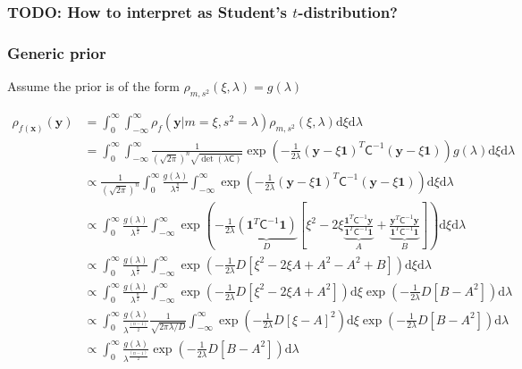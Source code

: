 \documentclass{svjour3}                     %
\newcommand{\bm}[1]{\boldsymbol{#1}}
\newcommand{\dif}[1]{\text{d}{#1}}
\newcommand{\vx}{\bm{x}}
\newcommand{\vy}{\bm{y}}
\newcommand{\vone}{\bm{1}}
\newcommand{\mC}{\mathsf{C}}
\newcommand{\mCInv}{\mathsf{C}^{-1}}
\begin{document}
\subsubsection{TODO: How to interpret as Student's $t$-distribution?}




\subsubsection{Generic prior}
Assume the prior is of the form $ \rho_{m,s^2} (\xi, \lambda) = g(\lambda) $ 

\begin{align*}
\rho_{f(\vx)}(\vy) &=\int_{0}^\infty \int_{-\infty}^\infty \rho_{f} (\vy | m=\xi, s^2=\lambda) 
\rho_{m,s^2} (\xi, \lambda) \dif{\xi} \dif{\lambda} 
\\
&= \int_{0}^\infty \int_{-\infty}^\infty \frac{1}{(\sqrt{2 \pi})^n \sqrt{\det(\lambda \mC)}} 
\exp \left( -\frac{1}{2\lambda} (\vy - \xi \vone)^T\mCInv (\vy- \xi\vone)\right) g(\lambda) \dif{\xi} \dif{\lambda}
\\
& \propto \frac{1}{(\sqrt{2 \pi})^n} \int_{0}^\infty \frac{g(\lambda)}{\lambda ^{\frac n2} } 
\int_{-\infty}^\infty \exp \left( -\frac{1}{2\lambda} (\vy - \xi \vone)^T\mCInv (\vy- \xi\vone)\right)  \dif{\xi} \dif{\lambda}
\\
& \propto \int_{0}^\infty \frac{g(\lambda)}{\lambda^{\frac n2 }}
\int_{-\infty}^\infty \exp \left( -\frac{1}{2\lambda} 
\underbrace{(\vone^T \mCInv \vone)}_{D}
\left[
\xi^2 -2 \xi \underbrace{\frac{\vone^T \mCInv \vy }{\vone^T \mCInv \vone}}_{A} + \underbrace{\frac{\vy^T \mCInv \vy }{\vone^T \mCInv \vone}}_{B} 
\right]
\right)  \dif{\xi} \dif{\lambda}
\\
& \propto \int_{0}^\infty \frac{g(\lambda)}{\lambda^{\frac n2}}
\int_{-\infty}^\infty \exp \left( -\frac{1}{2\lambda} D
\left[
\xi^2 -2 \xi A + A^2 - A^2 + B
\right]
\right)  \dif{\xi} \dif{\lambda}
\\
& \propto \int_{0}^\infty \frac{g(\lambda)}{\lambda^{\frac n2}}
\int_{-\infty}^\infty \exp \left( -\frac{1}{2\lambda} D
\left[
\xi^2 -2 \xi A + A^2
\right]
\right) \dif{\xi}
\exp \left(  - \frac{1}{2\lambda} D [B - A^2] \right)
\dif{\lambda}
\\
& \propto \int_{0}^\infty \frac{g(\lambda)}{\lambda^{\frac{(n-1)}{2}}}
\frac{1}{\sqrt{2\pi\lambda/D}}
\int_{-\infty}^\infty \exp \left( -\frac{1}{2\lambda} D
\left[
\xi-A
\right]^2
\right) \dif{\xi}
\exp \left(  - \frac{1}{2\lambda} D [B - A^2] \right)
\dif{\lambda}
\\
& \propto \int_{0}^\infty \frac{g(\lambda)}{\lambda^{\frac{(n-1)}{2}}}
\exp \left(  - \frac{1}{2\lambda} D [B - A^2] \right)
\dif{\lambda}
\end{align*}
\end{document}
